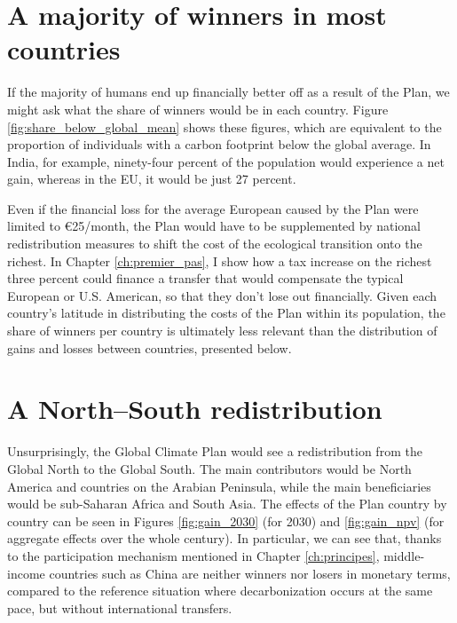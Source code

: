\documentclass[a5paper,english,openany]{memoir}
\begin{document}
\section*{A majority of winners in most countries}

If the majority of humans end up %
financially better off as a result of the Plan, we might ask what the share of winners would be in each country. Figure \ref{fig:share_below_global_mean} shows these figures, which are equivalent to the proportion of individuals with a carbon footprint below the global average. In India, for example, ninety-four percent of the population would experience a net gain, %
whereas %
in the EU, %
it %
would be just 27 percent. %

Even if the financial loss for the average European caused by the Plan were limited to %
\euro{}25/month, the Plan would have to be supplemented by national redistribution measures to shift the cost of the ecological transition %
onto the richest. In Chapter \ref{ch:premier_pas}, I show how a tax increase on the richest %
three percent %
could finance a transfer that would compensate the typical European or U.S. American, so that they don't lose out financially. Given each country's latitude in distributing the costs of the Plan within its population, the share of winners per country is ultimately less relevant %
than the distribution of gains and losses between countries, presented below.


\section*{A North--South redistribution}

Unsurprisingly, the Global Climate Plan would see a redistribution from the Global North to the Global South. The main contributors would be North America and countries on the Arabian Peninsula, while the main beneficiaries would be sub-Saharan Africa and South Asia. The effects of the Plan country by country can be seen in Figures \ref{fig:gain_2030} (for 2030) and \ref{fig:gain_npv} (for aggregate effects over the whole century). In particular, we can see that, thanks to the participation mechanism mentioned in Chapter \ref{ch:principes}, middle-income countries such as China are neither winners nor losers in monetary terms, compared to the reference situation where decarbonization occurs %
at the same pace, %
but without international transfers. 
\end{document}
